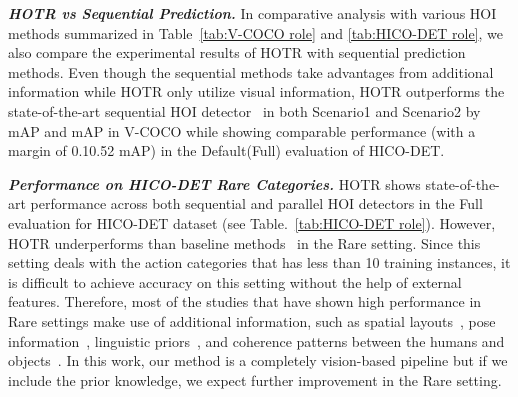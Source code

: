 \documentclass[final]{cvpr}
\begin{document}
\noindent\textit{\textbf{HOTR vs Sequential Prediction.}}
In comparative analysis with various HOI methods summarized in Table~\ref{tab:V-COCO role} and \ref{tab:HICO-DET role}, we also compare the experimental results of HOTR with sequential prediction methods.
Even though the sequential methods take advantages from additional information while HOTR only utilize visual information, HOTR outperforms the state-of-the-art sequential HOI detector~\cite{li2020hoi} in both Scenario1 and Scenario2 by  mAP and  mAP in V-COCO while showing comparable performance (with a margin of 0.10.52 mAP) in the Default(Full) evaluation of HICO-DET.
\newline


\noindent\textit{\textbf{Performance on HICO-DET Rare Categories.}}
HOTR shows state-of-the-art performance across both sequential and parallel HOI detectors in the Full evaluation for HICO-DET dataset (see Table.~\ref{tab:HICO-DET role}).
However, HOTR underperforms than baseline methods~\cite{li2020hoi} in the Rare setting.
Since this setting deals with the action categories that has less than 10 training instances, it is difficult to achieve accuracy on this setting without the help of external features.
Therefore, most of the studies that have shown high performance in Rare settings make use of additional information, such as spatial layouts~\cite{gao2018ican}, pose information~\cite{li2019transferable}, linguistic priors~\cite{li2020pastanet}, and coherence patterns between the humans and objects~\cite{li2020hoi}.
In this work, our method is a completely vision-based pipeline but if we include the prior knowledge, we expect further improvement in the Rare setting.
\end{document}
